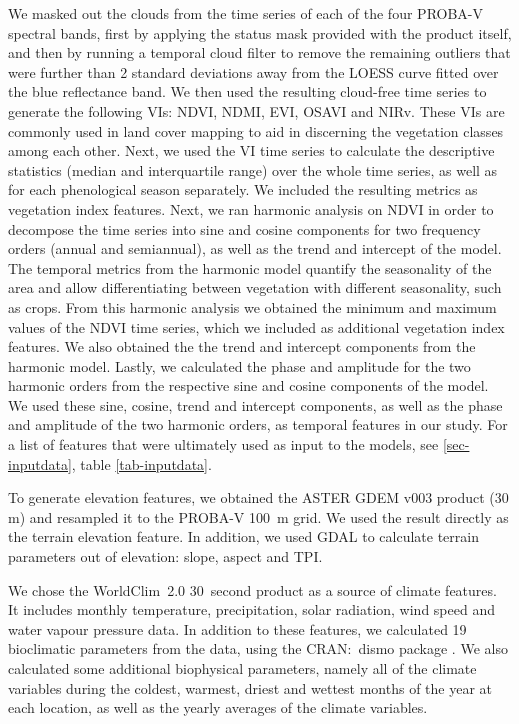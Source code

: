 \documentclass[review,authoryear,3p]{elsarticle}
\newcommand{\cran}[1]{CRAN:~#1}
\begin{document}
We masked out the clouds from the time series of each of the four PROBA-V spectral bands, first by applying the status mask provided with the product itself, and then by running a temporal cloud filter to remove the remaining outliers that were further than 2 standard deviations away from the \ac{LOESS} curve fitted over the blue reflectance band.
We then used the resulting cloud-free time series to generate the following \glspl{VI}: \gls{NDVI}, \gls{NDMI}, \gls{EVI}, \gls{OSAVI} and \gls{NIRv}.
These \glspl{VI} are commonly used in land cover mapping to aid in discerning the vegetation classes among each other.
Next, we used the \gls{VI} time series to calculate the descriptive statistics (median and interquartile range) over the whole time series, as well as for each phenological season separately.
We included the resulting metrics as vegetation index features.
Next, we ran harmonic analysis \citep{jakubauskas2001harmonic} on NDVI in order to decompose the time series into sine and cosine components for two frequency orders (annual and semiannual), as well as the trend and intercept of the model.
The temporal metrics from the harmonic model quantify the seasonality of the area and allow differentiating between vegetation with different seasonality, such as crops.
From this harmonic analysis we obtained the minimum and maximum values of the \gls{NDVI} time series, which we included as additional vegetation index features.
We also obtained the the trend and intercept components from the harmonic model.
Lastly, we calculated the phase and amplitude for the two harmonic orders from the respective sine and cosine components of the model.
We used these sine, cosine, trend and intercept components, as well as the phase and amplitude of the two harmonic orders, as temporal features in our study.
For a list of features that were ultimately used as input to the models, see \ref{sec-inputdata}, table \ref{tab-inputdata}.

To generate elevation features, we obtained the ASTER GDEM v003 \citep{ASTGTM003} product (30 m) and resampled it to the PROBA-V 100~m grid.
We used the result directly as the terrain elevation feature.
In addition, we used \gls{GDAL} \citep{gdal} to calculate terrain parameters out of elevation: slope, aspect and \ac{TPI}.

We chose the WorldClim~2.0 30~second product \citep{worldclim2} as a source of climate features.
It includes monthly temperature, precipitation, solar radiation, wind speed and water vapour pressure data.
In addition to these features, we calculated 19 bioclimatic parameters from the data, using the \cran{dismo} package \citep{dismo}.
We also calculated some additional biophysical parameters, namely all of the climate variables during the coldest, warmest, driest and wettest months of the year at each location, as well as the yearly averages of the climate variables.
\end{document}
